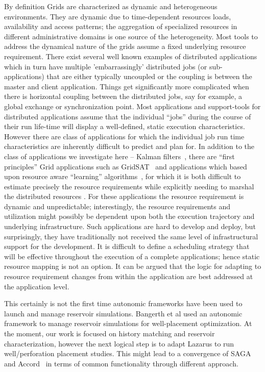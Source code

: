 \documentclass[conference,final]{IEEEtran}
\newcommand{\jhanote}[1]{ {\textcolor{red} { ***Jha: #1 }}}
\newcommand{\yyenote}[1]{ {\textcolor{blue} { ***yye00: #1 }}}
\newcommand{\jhanote}[1]{}
\newcommand{\yyenote}[1]{}
\begin{document}
By definition Grids are characterized as dynamic and heterogeneous
environments.  They are dynamic due to time-dependent resources loads,
availability and access patterns; the aggregation of specialized
resources in different administrative domains is one source of the
heterogeneity.  Most tools to address the dynamical nature of the
grids assume a fixed underlying resource requirement.  There exist
several well known examples of distributed applications which in turn
have multiple 'embarrassingly' distributed jobs (or sub-applications)
that are either typically uncoupled or the coupling is between the
master and client application.  Things get significantly more
complicated when there is horizontal coupling between the distributed
jobs, say for example, a global exchange or synchronization point.
Most applications and support-tools for distributed applications
assume that the individual ``jobs'' during the course of their run
life-time will display a well-defined, static execution
characteristics.  However there are class of applications for which
the individual job run time characteristics are inherently difficult
to predict and plan for.  In addition to the class of applications we
investigate here -- Kalman filters~\cite{DataAssim, KalmanPaper},
there are ``first principles'' Grid applications such as
GridSAT~\cite{gridsat03} and applications which based upon resource
aware ``learning'' algorithms~\cite{ majority_voting}, for which it is
both difficult to estimate precisely the resource requirements while
explicitly needing to marshal the distributed resources . For these
applications the resource requirement is dynamic and unpredictable;
interestingly, the resource requirements and utilization might
possibly be dependent upon both the execution trajectory and
underlying infrastructure. Such applications are hard to develop and
deploy, but surprisingly, they have traditionally not received the
same level of infrastructural support for the development. It is
difficult to define a scheduling strategy that will be effective
throughout the execution of a complete applications; hence static
resource mapping is not an option.  It can be argued that the logic
for adapting to resource requirement changes from within the
application are best addressed at the application level.

This certainly is not the first time autonomic frameworks have been
used to launch and manage reservoir simulations. Bangerth et al
\cite{Manish} used an autonomic framework to manage reservoir
simulations for well-placement optimization. At the moment, our work
is focused on history matching and reservoir characterization, however
the next logical step is to adapt Lazarus to run well/perforation
placement studies. This might lead to a convergence of SAGA and
Accord~\cite{accord} in terms of common functionality through
different approach.
\end{document}
